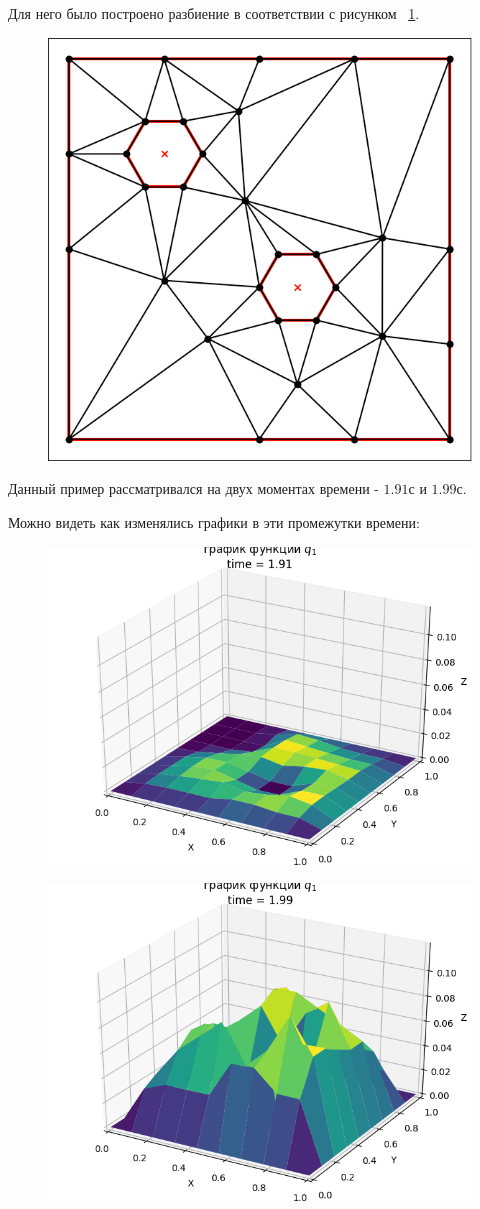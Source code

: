 \documentclass[14pt]{extreport}
\begin{document}
Для него было построено разбиение в соответствии с рисунком ~\ref{img:ex3:mesh}.

\begin{figure}[H]
\centerline{
\includegraphics[width=0.5\linewidth]{images/ex3/mesh}}
\caption{}
\label{img:ex3:mesh}
\end{figure}

Данный пример рассматривался на двух моментах времени - $1.91$с и $1.99$с.

Можно видеть как изменялись графики в эти промежутки времени:

\begin{figure}[H]
\centerline{
\includegraphics[width=0.5\linewidth]{images/ex3/q_1/91}}
\caption{}
\label{img:ex3:q1:91}
\end{figure}

\begin{figure}[H]
\centerline{
\includegraphics[width=0.5\linewidth]{images/ex3/q_1/99}}
\caption{}
\label{img:ex3:q1:99}
\end{figure}
\end{document}
